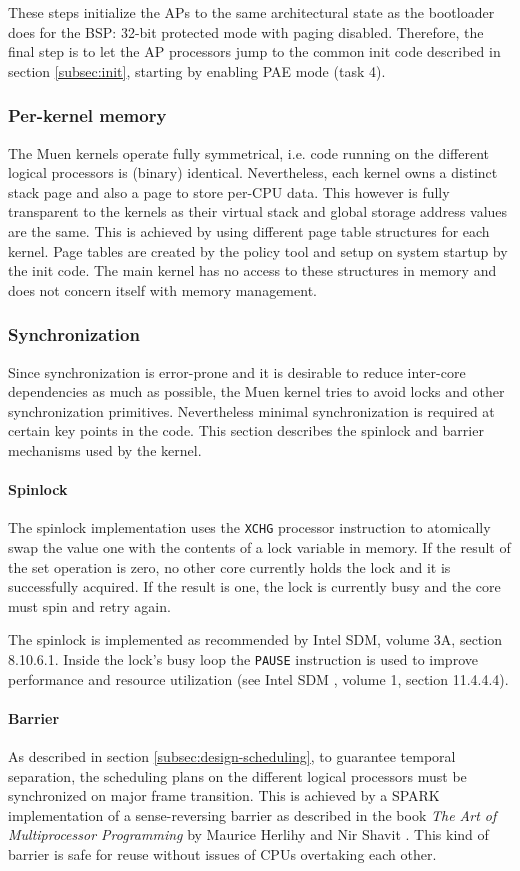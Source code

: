 These steps initialize the APs to the same architectural state as the
bootloader does for the BSP: 32-bit protected mode with paging disabled.
Therefore, the final step is to let the AP processors jump to the common init
code described in section \ref{subsec:init}, starting by enabling PAE mode
(task 4).

\subsubsection{Per-kernel memory}
The Muen kernels operate fully symmetrical, i.e. code running on the different
logical processors is (binary) identical. Nevertheless, each kernel owns a
distinct stack page and also a page to store per-CPU data. This however is fully
transparent to the kernels as their virtual stack and global storage address
values are the same. This is achieved by using different page table structures
for each kernel. Page tables are created by the policy tool and setup on system
startup by the init code. The main kernel has no access to these structures in
memory and does not concern itself with memory management.

\subsubsection{Synchronization} Since synchronization is error-prone and it is
desirable to reduce inter-core dependencies as much as possible, the Muen
kernel tries to avoid locks and other synchronization primitives. Nevertheless
minimal synchronization is required at certain key points in the code. This
section describes the spinlock and barrier mechanisms used by the kernel.

\paragraph{Spinlock}
The spinlock implementation uses the \texttt{XCHG} processor instruction to
atomically swap the value one with the contents of a lock variable in memory.
If the result of the set operation is zero, no other core currently holds the
lock and it is successfully acquired. If the result is one, the lock is
currently busy and the core must spin and retry again.

The spinlock is implemented as recommended by Intel SDM, volume 3A, section
8.10.6.1. Inside the lock's busy loop the \texttt{PAUSE} instruction is used to
improve performance and resource utilization (see Intel SDM \cite{IntelSDM},
volume 1, section 11.4.4.4).

\paragraph{Barrier}
As described in section \ref{subsec:design-scheduling}, to guarantee temporal
separation, the scheduling plans on the different logical processors must be
synchronized on major frame transition. This is achieved by a SPARK
implementation of a sense-reversing barrier as described in the book \emph{The
Art of Multiprocessor Programming} by Maurice Herlihy and Nir Shavit
\cite{Herlihy:2008:AMP:1734069}. This kind of barrier is safe for reuse without
issues of CPUs overtaking each other.
